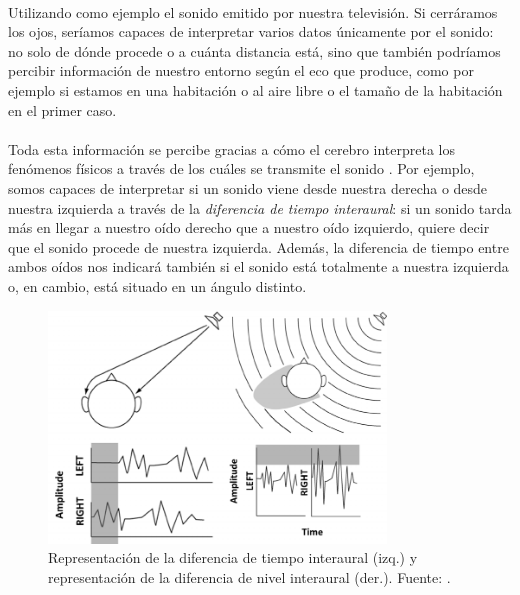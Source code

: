 \documentclass{subfiles}
\begin{document}
        \paragraph{}
        Utilizando como ejemplo el sonido emitido por nuestra televisión. Si cerráramos los ojos, seríamos capaces de interpretar varios datos únicamente por el sonido: no solo de dónde procede o a cuánta distancia está, sino que también podríamos percibir información de nuestro entorno según el eco que produce, como por ejemplo si estamos en una habitación o al aire libre o el tamaño de la habitación en el primer caso.

        \paragraph{}
        Toda esta información se percibe gracias a cómo el cerebro interpreta los fenómenos físicos a través de los cuáles se transmite el sonido \cite{web:resonance_audio_localizacion_sonido, web:wikipedia_localizacion_sonido}. Por ejemplo, somos capaces de interpretar si un sonido viene desde nuestra derecha o desde nuestra izquierda a través de la \textit{diferencia de tiempo interaural}: si un sonido tarda más en llegar a nuestro oído derecho que a nuestro oído izquierdo, quiere decir que el sonido procede de nuestra izquierda. Además, la diferencia de tiempo entre ambos oídos nos indicará también si el sonido está totalmente a nuestra izquierda o, en cambio, está situado en un ángulo distinto.

        \begin{figure}
        \centering
        \includegraphics[width=0.8\textwidth]{img/ITD_ILD.png}
        \caption[Representación de la diferencia de tiempo interaural (izq.) y de la diferencia de nivel interaural (der.).]{Representación de la diferencia de tiempo interaural (izq.) y representación de la diferencia de nivel interaural (der.). Fuente: .}
        \label{fig:ITD_ILD}
        \end{figure}
\end{document}
